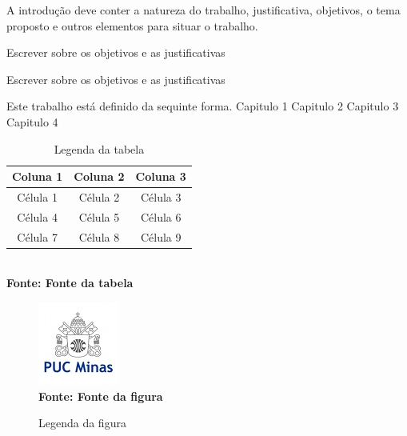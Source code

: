 
\iniciocapitulo
A introdução deve conter a natureza do trabalho, justificativa, objetivos, o tema proposto e outros elementos para situar o trabalho.\par

Escrever sobre os objetivos e as justificativas

Escrever sobre os objetivos e as justificativas

Este trabalho está definido da sequinte forma. Capitulo 1 Capitulo 2 Capitulo 3 Capitulo 4 


\begin{table}[!htb]
	\caption[Descrição na Lista de Tabelas]{Legenda da tabela}
	\centering
	\label{tab:tabela}
	\begin{tabular}{c|c|c}
		\hline
		Coluna 1 & Coluna 2 & Coluna 3 \\
		\hline
 		Célula 1 & Célula 2 & Célula 3 \\
		Célula 4 & Célula 5 & Célula 6 \\
		Célula 7 & Célula 8 & Célula 9 \\
		\hline
	\end{tabular}
	\\ \textbf{\footnotesize Fonte: Fonte da tabela}
\end{table}


\begin{figure}[!htb]
   \caption[Descrição na Lista de Figuras]{Legenda da figura}
   \label{fig:figura1}
   \centering
   \includegraphics{LogoPUC.jpg}
   \\ \textbf{\footnotesize Fonte: Fonte da figura}
\end{figure}
